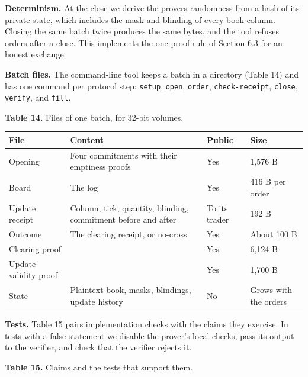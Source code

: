 \textbf{Determinism.} At the close we derive the prover\textquotesingle s randomness from a hash of its private state, which includes the mask and blinding of every book column. Closing the same batch twice produces the same bytes, and the tool refuses orders after a close. This implements the one-proof rule of Section 6.3 for an honest exchange.

\textbf{Batch files.} The command-line tool keeps a batch in a directory (Table 14) and has one command per protocol step: \texttt{setup}, \texttt{open}, \texttt{order}, \texttt{check-receipt}, \texttt{close}, \texttt{verify}, and \texttt{fill}.

\textbf{Table 14.} Files of one batch, for 32-bit volumes.

\begin{longtable}[]{@{}llll@{}}
\toprule\noalign{}
File & Content & Public & Size \\
\midrule\noalign{}
\endhead
\bottomrule\noalign{}
\endlastfoot
Opening & Four commitments with their emptiness proofs & Yes & 1,576 B \\
Board & The log & Yes & 416 B per order \\
Update receipt & Column, tick, quantity, blinding, commitment before and after & To its trader & 192 B \\
Outcome & The clearing receipt, or no-cross & Yes & About 100 B \\
Clearing proof & & Yes & 6,124 B \\
Update-validity proof & & Yes & 1,700 B \\
State & Plaintext book, masks, blindings, update history & No & Grows with the orders \\
\end{longtable}

\textbf{Tests.} Table 15 pairs implementation checks with the claims they exercise. In tests with a false statement we disable the prover's local checks, pass its output to the verifier, and check that the verifier rejects it.

\textbf{Table 15.} Claims and the tests that support them.

